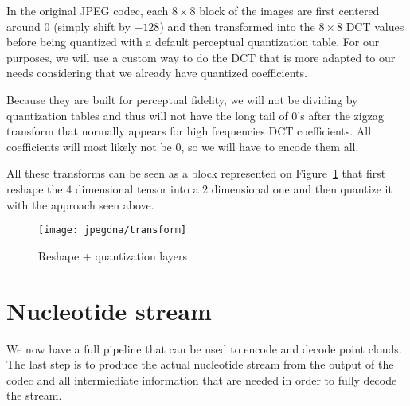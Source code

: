 In the original JPEG codec, each $8 \times 8$ block of the images are first centered around $0$ (simply shift by $-128$) and then transformed into the $8 \times 8$ DCT values before being quantized with a default perceptual quantization table. 
For our purposes, we will use a custom way to do the DCT that is more adapted to our needs considering that we already have quantized coefficients.

Because they are built for perceptual fidelity, we will not be dividing by quantization tables and thus will not have the long tail of $0$'s after the zigzag transform that normally appears for high frequencies DCT coefficients. All coefficients will most likely not be $0$, so we will have to encode them all.

All these transforms can be seen as a block represented on Figure~\ref{fig:reshape+quantization} that first reshape the $4$ dimensional tensor into a $2$ dimensional one and then quantize it with the approach seen above.

\begin{figure}
    \centering
    \texttt{[image: jpegdna/transform]}
    \caption{Reshape + quantization layers}
    \label{fig:reshape+quantization}
\end{figure}

% 

\section{Nucleotide stream}

We now have a full pipeline that can be used to encode and decode point clouds. The last step is to produce the actual nucleotide stream from the output of the codec and all intermiediate information that are needed in order to fully decode the stream.

